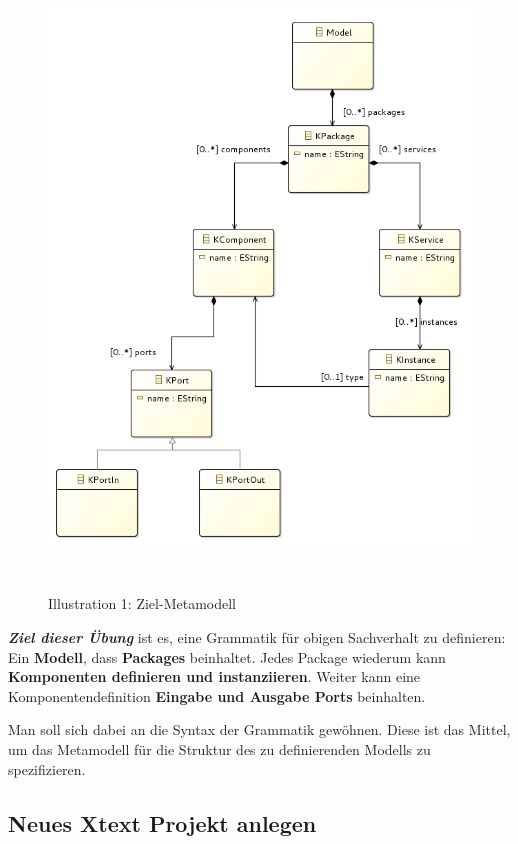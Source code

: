 \documentclass[]{article}
\begin{document}
\begin{figure}
\centering
\includegraphics[width=5.12520in,height=6.50830in]{./Pictures/10000201000002670000030DD0AB9EF4251EDB4D.png}
\caption{Illustration 1: Ziel-Metamodell}
\end{figure}

\emph{\textbf{Ziel dieser Übung }}ist es, eine Grammatik für obigen
Sachverhalt zu definieren: Ein \textbf{Modell}, dass \textbf{Packages
}beinhaltet. Jedes Package wiederum kann \textbf{Komponenten definieren
und instanziieren}. Weiter kann eine Komponentendefinition
\textbf{Eingabe und Ausgabe Ports }beinhalten.

Man soll sich dabei an die Syntax der Grammatik gewöhnen. Diese ist das
Mittel, um das Metamodell für die Struktur des zu definierenden Modells
zu spezifizieren.

\subsection{}\label{section}

\subsection[Neues Xtext Projekt
anlegen]{\texorpdfstring{\protect\hypertarget{anchor-18}{}{}Neues Xtext
Projekt
anlegen}{Neues Xtext Projekt anlegen}}\label{neues-xtext-projekt-anlegen}
\end{document}
